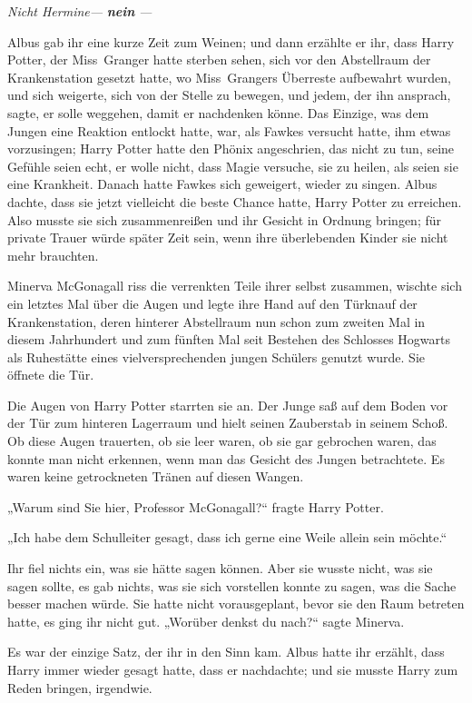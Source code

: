 {\emph{Nicht Hermine—} \textbf{\emph{nein}} \emph{—}

Albus gab ihr eine kurze Zeit zum Weinen; und dann erzählte er ihr, dass Harry Potter, der Miss~Granger hatte sterben sehen, sich vor den Abstellraum der Krankenstation gesetzt hatte, wo Miss~Grangers Überreste aufbewahrt wurden, und sich weigerte, sich von der Stelle zu bewegen, und jedem, der ihn ansprach, sagte, er solle weggehen, damit er nachdenken könne. Das Einzige, was dem Jungen eine Reaktion entlockt hatte, war, als Fawkes versucht hatte, ihm etwas vorzusingen; Harry Potter hatte den Phönix angeschrien, das nicht zu tun, seine Gefühle seien echt, er wolle nicht, dass Magie versuche, sie zu heilen, als seien sie eine Krankheit. Danach hatte Fawkes sich geweigert, wieder zu singen. Albus dachte, dass sie jetzt vielleicht die beste Chance hatte, Harry Potter zu erreichen. Also musste sie sich zusammenreißen und ihr Gesicht in Ordnung bringen; für private Trauer würde später Zeit sein, wenn ihre überlebenden Kinder sie nicht mehr brauchten.

Minerva McGonagall riss die verrenkten Teile ihrer selbst zusammen, wischte sich ein letztes Mal über die Augen und legte ihre Hand auf den Türknauf der Krankenstation, deren hinterer Abstellraum nun schon zum zweiten Mal in diesem Jahrhundert und zum fünften Mal seit Bestehen des Schlosses Hogwarts als Ruhestätte eines vielversprechenden jungen Schülers genutzt wurde. Sie öffnete die Tür.

Die Augen von Harry Potter starrten sie an. Der Junge saß auf dem Boden vor der Tür zum hinteren Lagerraum und hielt seinen Zauberstab in seinem Schoß. Ob diese Augen trauerten, ob sie leer waren, ob sie gar gebrochen waren, das konnte man nicht erkennen, wenn man das Gesicht des Jungen betrachtete. Es waren keine getrockneten Tränen auf diesen Wangen.

„Warum sind Sie hier, Professor McGonagall?“ fragte Harry Potter.

„Ich habe dem Schulleiter gesagt, dass ich gerne eine Weile allein sein möchte.“

Ihr fiel nichts ein, was sie hätte sagen können. Aber sie wusste nicht, was sie sagen sollte, es gab nichts, was sie sich vorstellen konnte zu sagen, was die Sache besser machen würde. Sie hatte nicht vorausgeplant, bevor sie den Raum betreten hatte, es ging ihr nicht gut. „Worüber denkst du nach?“ sagte Minerva.

Es war der einzige Satz, der ihr in den Sinn kam. Albus hatte ihr erzählt, dass Harry immer wieder gesagt hatte, dass er nachdachte; und sie musste Harry zum Reden bringen, irgendwie.

}
